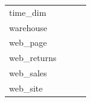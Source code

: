 \documentclass[conference]{IEEEtran}
\begin{document}
\begin{table}[htbp]
\begin{center}
\begin{tabular}{|l|c|c|c|}
			time\_dim               & \checkmark          & \checkmark         & \checkmark     \\
			warehouse               & \checkmark          & \checkmark         & \checkmark     \\
			web\_page               &                     &                    & \checkmark     \\
			web\_returns            &                     &                    & \checkmark     \\
			web\_sales              &                     &                    & \checkmark     \\
			web\_site               &                     &                    & \checkmark     \\
			\hline
		\end{tabular}
		\label{table:data-distribution-1}
	\end{center}
\end{table}
\end{document}
